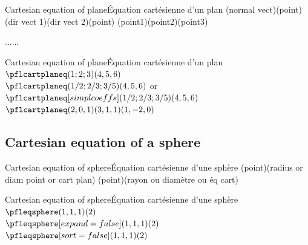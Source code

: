 \documentclass[a4paper,english,11pt]{article}
\begin{document}
\begin{myprestexcode}{Cartesian equation of plane}{Équation cartésienne d'un plan}
\pflcartplaneq[keys](normal vect)(point)
\pflcartplaneq[keys](dir vect 1)(dir vect 2)(point)
\pflcartplaneq[keys](point1)(point2)(point3)

\TrouveEqCartPlan[keys]......

\end{myprestexcode}

\begin{myprestex}{Cartesian equation of plane}{Équation cartésienne d'un plan}
$\pflcartplaneq(1;2;3)(4,5,6)$\\
$\pflcartplaneq(1/2;2/3;3/5)(4,5,6)$ or
$\pflcartplaneq[simpl coeffs](1/2;2/3;3/5)(4,5,6)$\\
$\pflcartplaneq(2,0,1)(3,1,1)(1,-2,0)$
\end{myprestex}

\subsection{Cartesian equation of a sphere}

\begin{myprestexcode}{Cartesian equation of sphere}{Équation cartésienne d'une sphère}
\pfleqsphere[keys](point)(radius or diam point or cart plan)
\TrouveEqSphere[clés](point)(rayon ou diamètre ou éq cart)

\end{myprestexcode}

\begin{myprestex}{Cartesian equation of sphere}{Équation cartésienne d'une sphère}
$\pfleqsphere(1,1,1)(2)$\\
$\pfleqsphere[expand=false](1,1,1)(2)$\\
$\pfleqsphere[sort=false](1,1,1)(2)$
\end{myprestex}
\end{document}

